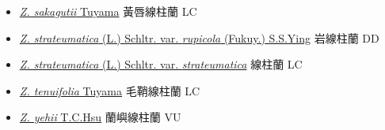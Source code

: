 \begin{itemize}
\begin{itemize}
        \item[] \href{http://www.theplantlist.org/tpl1.1/search?q=Zeuxine+sakagutii}{\textit{Z. sakagutii} Tuyama}   黃唇線柱蘭   LC
        \item[] \href{http://www.theplantlist.org/tpl1.1/search?q=Zeuxine+strateumatica+var.+rupicola}{\textit{Z. strateumatica} (L.) Schltr. var. \textit{rupicola} (Fukuy.) S.S.Ying}   岩線柱蘭   DD
        \item[] \href{http://www.theplantlist.org/tpl1.1/search?q=Zeuxine+strateumatica+var.+strateumatica}{\textit{Z. strateumatica} (L.) Schltr. var. \textit{strateumatica}}   線柱蘭   LC
        \item[] \href{http://www.theplantlist.org/tpl1.1/search?q=Zeuxine+tenuifolia}{\textit{Z. tenuifolia} Tuyama}   毛鞘線柱蘭   LC
        \item[] \href{http://www.theplantlist.org/tpl1.1/search?q=Zeuxine+yehii}{\textit{Z. yehii} T.C.Hsu}   蘭嶼線柱蘭   VU
  \end{itemize}
  \end{itemize}
